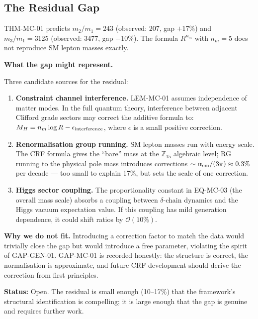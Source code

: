 \documentclass[12pt, a4paper]{article}
\begin{document}
\subsection{The Residual Gap}
\label{zc16:sec:gap-mc-01}

\begin{openqbox}[title={GAP-MC-01: Residual 10--17\% gap
  in lepton mass ratios (Open)}]
\label{zc16:gap:residual}
THM-MC-01 predicts $m_2/m_1 = 243$ (observed: 207,
gap $+17\%$) and $m_3/m_1 = 3125$ (observed: 3477,
gap $-10\%$). The formula $R^{n_m}$ with $n_m = 5$ does not
reproduce SM lepton masses exactly.

\textbf{What the gap might represent.}

Three candidate sources for the residual:
\begin{enumerate}[leftmargin=*, noitemsep]
  \item \textbf{Constraint channel interference.}
    LEM-MC-01 assumes independence of matter modes.
    In the full quantum theory, interference between
    adjacent Clifford grade sectors may correct the
    additive formula to:
    $M_H = n_m \log R - \epsilon_{\rm interference}$,
    where $\epsilon$ is a small positive correction.
  \item \textbf{Renormalisation group running.}
    SM lepton masses run with energy scale. The CRF
    formula gives the ``bare'' mass at the $\mathbb{Z}_{15}$
    algebraic level; RG running to the physical pole
    mass introduces corrections $\sim \alpha_{\rm em}
    / (3\pi) \approx 0.3\%$ per decade --- too small
    to explain 17\%, but sets the scale of one correction.
  \item \textbf{Higgs sector coupling.}
    The proportionality constant in EQ-MC-03 (the
    overall mass scale) absorbs a coupling between
    $\delta$-chain dynamics and the Higgs vacuum
    expectation value. If this coupling has mild
    generation dependence, it could shift ratios
    by $\mathcal{O}(10\%)$.
\end{enumerate}

\textbf{Why we do not fit.}
Introducing a correction factor to match the data would
trivially close the gap but would introduce a free parameter,
violating the spirit of GAP-GEN-01. GAP-MC-01 is recorded
honestly: the structure is correct, the normalisation is
approximate, and future CRF development should derive the
correction from first principles.

\textbf{Status:} Open. The residual is small enough (10--17\%)
that the framework's structural identification is compelling;
it is large enough that the gap is genuine and requires
further work.
\end{openqbox}
\end{document}
